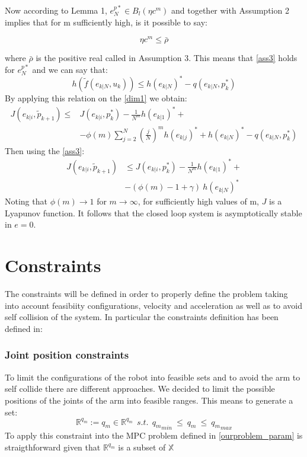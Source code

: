 Now according to Lemma 1, $e_N^{p*} \in B_l(\eta c^m)$ and together with Assumption 2 implies that for m sufficiently high, is it possible to say:

\begin{equation}
\eta c^m \leq \bar{\rho}
\end{equation}

where $\bar{\rho}$ is the positive real called in Assumption 3.
This means that \ref{ass3} holds for $e_N^{p*}$ and we can say that:
\begin{equation*}
    h(\tilde{f}(e_{k|N},u_k)) \le h(e_{k|N})^*-q(e_{k|N},p_k^*)
\end{equation*}
By applying this relation on the \ref{dim1} we obtain: 
\begin{equation*}
    \begin{split}
        J({e}_{k|i},\tilde{p}_{k+1})\le &J({e}_{k|i},p_{k}^*) - \frac{1}{N^m}h(e_{k|1})^*+ \\ 
        &-\phi(m)\sum_{j=2}^{N}\left(\frac{j}{N}\right)^m h(e_{k|j})^*+ h(e_{k|N})^*-q(e_{k|N},p_k^*)
    \end{split}
\end{equation*}
Then using the \ref{ass3}:
\begin{equation*}
    \begin{split}
        J({e}_{k|i},\tilde{p}_{k+1})&\le J({e}_{k|i},p_{k}^*) - \frac{1}{N^m}h(e_{k|1})^*+ \\ 
            &-(\phi(m)-1+\gamma)\ h(e_{k|N})^*
    \end{split}
\end{equation*}
Noting that $\phi(m) \rightarrow 1$ for $m \rightarrow \infty$, for sufficiently high values of m, $J$ is a Lyapunov function. It follows that the closed loop system is asymptotically stable in $e=0$.



\section{Constraints}

The constraints will be defined in order to properly define the problem taking into account feasibiity configurations, velocity and acceleration as well as to avoid self collision of the system. In particular the constraints definition has been defined in: 

\subsubsection*{Joint position constraints}
	To limit the configurations of the robot into feasible sets and to avoid the arm to self collide there are different approaches. We decided to limit the possible positions of the joints of the arm into feasible ranges. This means to generate a set:
	\begin{equation}
		\mathbb{R}^{q_m}:=q_m \in \mathbb{R}^{q_m}\ \ s.t.\ \  {q_m}_{min}\ \leq\ q_m\ \leq\ {q_m}_{max} 
	\end{equation}
	To apply this constraint into the MPC problem defined in \ref{ourproblem_param} is straigthforward given that $\mathbb{R}^{q_m}$ is a subset of $\mathbb{X}$
